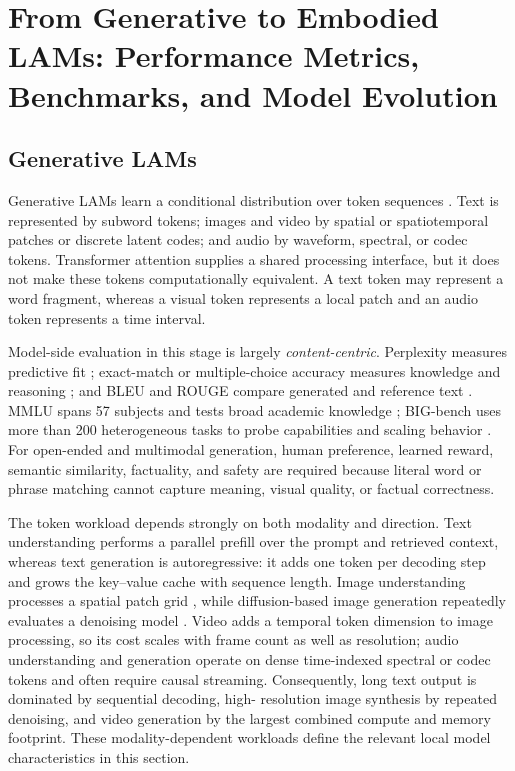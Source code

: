 \documentclass[letterpaper,journal]{IEEEtran}
\begin{document}
\section{From Generative to Embodied LAMs: Performance Metrics, Benchmarks, and Model Evolution}
\label{sec:model_evolution}
\subsection{Generative LAMs}
Generative LAMs learn a conditional distribution over token sequences
\cite{gpt3,dalle}.
Text is represented by subword tokens; images and video by spatial or
spatiotemporal patches or discrete latent codes; and audio by waveform,
spectral, or codec tokens. Transformer attention supplies a shared processing
interface, but it does not make these tokens computationally equivalent. A text
token may represent a word fragment, whereas a visual token represents a local
patch and an audio token represents a time interval.

Model-side evaluation in this stage is largely \emph{content-centric}.
Perplexity measures predictive fit \cite{gpt3}; exact-match or multiple-choice
accuracy measures knowledge and reasoning \cite{mmlu}; and BLEU and ROUGE
compare generated and reference text \cite{bleu,rouge}. MMLU spans 57 subjects
and tests broad academic knowledge \cite{mmlu}; BIG-bench uses more than 200
heterogeneous tasks to probe capabilities and scaling behavior
\cite{bigbench}. For open-ended and multimodal generation, human preference,
learned reward, semantic similarity, factuality, and safety are required because
literal word or phrase matching cannot capture meaning, visual quality, or
factual correctness.

The token workload depends strongly on both modality and direction. Text
understanding performs a parallel prefill over the prompt and retrieved
context, whereas text generation is autoregressive: it adds one token per
decoding step and grows the key--value cache with sequence length. Image
understanding processes a spatial patch grid \cite{vit}, while diffusion-based
image generation repeatedly evaluates a denoising model \cite{ddpm}. Video adds
a temporal token dimension to image processing, so its cost scales with frame
count as well as resolution; audio understanding and generation operate on
dense time-indexed spectral or codec tokens and often require causal streaming.
Consequently, long text output is dominated by sequential decoding, high-
resolution image synthesis by repeated denoising, and video generation by the
largest combined compute and memory footprint. These modality-dependent
workloads define the relevant local model characteristics in this section.
\end{document}
